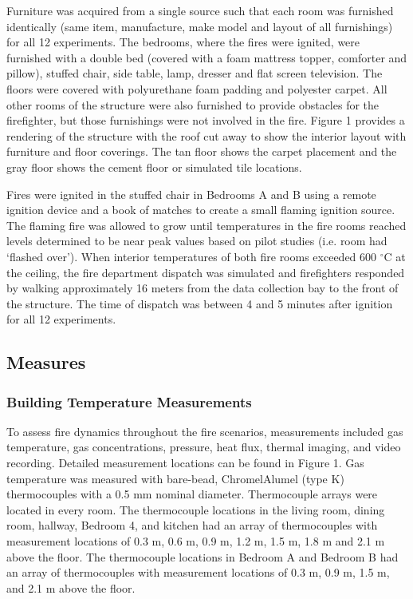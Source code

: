 \documentclass[12pt,oneside]{article}
\begin{document}
Furniture was acquired from a single source such that each room was furnished identically (same item, manufacture, make model and layout of all furnishings) for all 12 experiments. The bedrooms, where the fires were ignited, were furnished with a double bed (covered with a foam mattress topper, comforter and pillow), stuffed chair, side table, lamp, dresser and flat screen television.  The floors were covered with polyurethane foam padding and polyester carpet.  All other rooms of the structure were also furnished to provide obstacles for the firefighter, but those furnishings were not involved in the fire. Figure 1 provides a rendering of the structure with the roof cut away to show the interior layout with furniture and floor coverings.  The tan floor shows the carpet placement and the gray floor shows the cement floor or simulated tile locations.  

Fires were ignited in the stuffed chair in Bedrooms  A and B using a remote ignition device and a book of matches to create a small flaming ignition source.  The flaming fire was allowed to grow until temperatures in the fire rooms reached levels determined to be near peak values based on pilot studies (i.e. room had ‘flashed over').  When interior temperatures of both fire rooms exceeded 600 $^{\circ}$C at the ceiling, the fire department dispatch was simulated and firefighters responded by walking approximately 16 meters from the data collection bay to the front of the structure.  The time of dispatch was between 4 and 5 minutes after ignition for all 12 experiments.  

\subsection{Measures}

\subsubsection{Building Temperature Measurements}
To assess fire dynamics throughout the fire scenarios, measurements included gas temperature, gas concentrations, pressure, heat flux, thermal imaging, and video recording. Detailed measurement locations can be found in Figure 1.  
Gas temperature was measured with bare-bead, ChromelAlumel (type K) thermocouples with a 0.5 mm nominal diameter. Thermocouple arrays were located in every room. The thermocouple locations in the living room, dining room, hallway, Bedroom 4, and kitchen had an array of thermocouples with measurement locations of 0.3 m, 0.6 m, 0.9 m, 1.2 m, 1.5 m, 1.8 m and 2.1 m above the floor. The thermocouple locations in Bedroom A and Bedroom B had an array of thermocouples with measurement locations of 0.3 m, 0.9 m, 1.5 m, and 2.1 m above the floor. 
\end{document}
